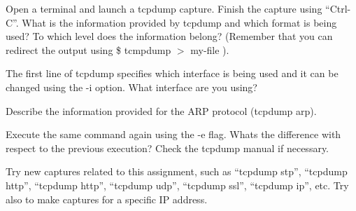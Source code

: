 Open a terminal and launch a tcpdump capture.
Finish the capture using ``Ctrl-C''.
What is the information provided by tcpdump and which format is being used?
To which level does the information belong?
(Remember that you can redirect the output using \$ tcmpdump $>$ my-file ).

The first line of tcpdump specifies which interface is being used and it can be changed using the -i option.
What interface are you using?

Describe the information provided for the ARP protocol (tcpdump arp).

Execute the same command again using the -e flag.
Whats the difference with respect to the previous execution?
Check the tcpdump manual if necessary.

Try new captures related to this assignment, such as ``tcpdump stp'', ``tcpdump http'', ``tcpdump http'', ``tcpdump udp'', ``tcpdump ssl'', ``tcpdump ip'', etc.
Try also to make captures for a specific IP address.
